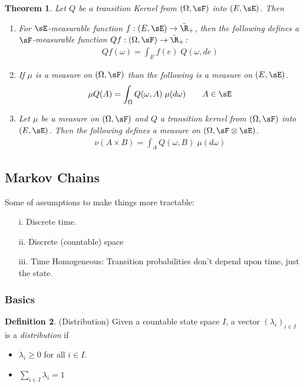 \documentclass[12pt]{article}
\theoremstyle{plain}
\newtheorem{thm}{Theorem}[section]
\theoremstyle{definition}
\newtheorem{defn}[thm]{Definition}
\theoremstyle{remark}
\newcommand{\ra}{\rightarrow}
\begin{document}
\begin{thm}
Let $Q$ be a transition Kernel from $(\Omega,\sF)$ into $(E,\sE)$.
Then
\begin{enumerate}
  \item For $\sE$-measurable function $f:(E,\sE)\ra\bar{\R}_+$,
    then the following defines a $\sF$-measurable function
    $Qf:(\Omega,\sF)\ra\bar{\R}_+$:
    \begin{align*}
      Qf(\omega) = \int_E f(e) \; Q(\omega,de)
    \end{align*}

  \item If $\mu$ is a measure on $(\Omega,\sF)$ than the following is a
    measure on $(E,\sE)$.
    \begin{align*}
      \mu Q(A) = \int_\Omega Q(\omega,A) \;\mu(d\omega)
      \qquad A\in\sE
    \end{align*}

  \item Let $\mu$ be a measure on $(\Omega,\sF)$ and $Q$ a transition
    kernel from $(\Omega,\sF)$ into $(E,\sE)$. Then
    the following defines a measure on $(\Omega,\sF\otimes \sE)$.
    \begin{align*}
      \nu(A\times B) = \int_A Q(\omega,B)\;\mu(d\omega)
    \end{align*}
\end{enumerate}
\end{thm}

\subsection{Markov Chains}

Some of assumptions to make things more tractable:
\begin{enumerate}
  \item[i.] Discrete time.
  \item[ii.] Discrete (countable) space
  \item[iii.] Time Homogeneous: Transition probabilities don't depend
    upon time, just the state.
\end{enumerate}

\subsubsection{Basics}

\begin{defn}(Distribution)
Given a countable state space $I$, a vector $(\lambda_i)_{i\in I}$ is a
\emph{distribution} if
\begin{itemize}
  \item $\lambda_i\geq 0$ for all $i\in I$.
  \item $\sum_{i\in I} \lambda_i= 1$
\end{itemize}
\end{defn}
\end{document}

